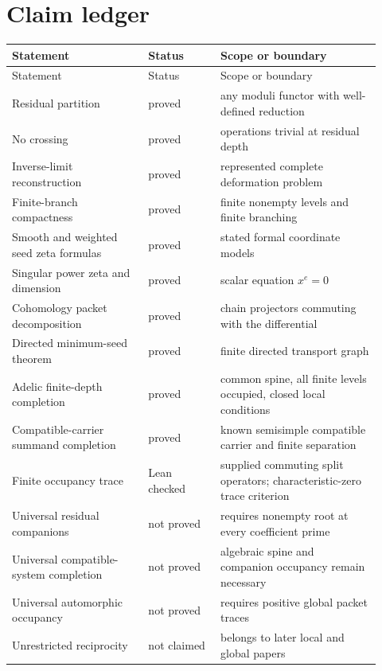 \documentclass[11pt]{article}
\theoremstyle{definition}
\theoremstyle{remark}
\begin{document}
\section{Claim ledger}

\begin{longtable}{p{0.34\linewidth}p{0.18\linewidth}p{0.40\linewidth}}
\toprule
Statement & Status & Scope or boundary\\
\midrule
\endfirsthead
\toprule
Statement & Status & Scope or boundary\\
\midrule
\endhead
Residual partition & proved & any moduli functor with well-defined reduction\\
No crossing & proved & operations trivial at residual depth\\
Inverse-limit reconstruction & proved & represented complete deformation problem\\
Finite-branch compactness & proved & finite nonempty levels and finite branching\\
Smooth and weighted seed zeta formulas & proved & stated formal coordinate models\\
Singular power zeta and dimension & proved & scalar equation \(x^e=0\)\\
Cohomology packet decomposition & proved & chain projectors commuting with the differential\\
Directed minimum-seed theorem & proved & finite directed transport graph\\
Adelic finite-depth completion & proved & common spine, all finite levels occupied, closed local conditions\\
Compatible-carrier summand completion & proved & known semisimple compatible carrier and finite separation\\
Finite occupancy trace & Lean checked & supplied commuting split operators; characteristic-zero trace criterion\\
Universal residual companions & not proved & requires nonempty root at every coefficient prime\\
Universal compatible-system completion & not proved & algebraic spine and companion occupancy remain necessary\\
Universal automorphic occupancy & not proved & requires positive global packet traces\\
Unrestricted reciprocity & not claimed & belongs to later local and global papers\\
\bottomrule
\end{longtable}
\end{document}

